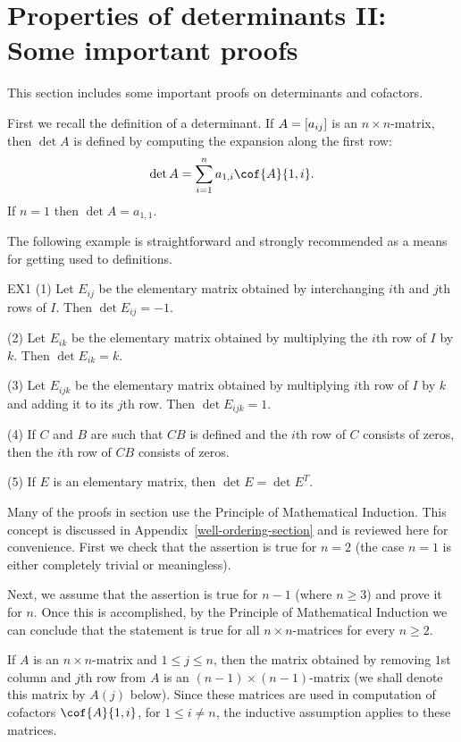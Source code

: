 \section{Properties of determinants II: Some important proofs } \label{sec:determinant-proofs}

This section includes some important proofs on determinants and cofactors.

First we recall the definition of a determinant. If $A=\left[a_{ij} \right]$ is an $n\times n$-matrix, then $\det A$ is defined by computing the expansion along the first row:
\begin{equation}
\label{E1} 
\det A=\sum_{i=1}^n a_{1,i} \cof{A}{1,i}. 
\end{equation}
If $n=1$ then $\det A=a_{1,1}$. 

The following example is straightforward and strongly recommended as a means for
getting used to definitions. 

\begin{example}{}{EX1}
(1) Let $E_{ij}$ be the elementary matrix obtained by interchanging $i$th and $j$th rows of $I$. 
Then $\det E_{ij}=-1$. 

(2) Let $E_{ik}$ be the elementary matrix obtained by multiplying the $i$th row of $I$ by $k$. 
Then $\det E_{ik}=k$. 

(3) Let $E_{ijk}$ be the elementary matrix obtained by multiplying $i$th row of $I$ by $k$ and 
adding it to its $j$th row. Then $\det E_{ijk}=1$. 

(4) If $C$ and $B$ are such that $CB$ is defined and the $i$th row of $C$ consists of zeros, 
then the $i$th row of $CB$ consists of zeros. 

(5) If $E$ is an elementary matrix, then $\det E=\det E^T$. 
\end{example} 

Many of the proofs in section use the Principle of Mathematical Induction. This concept is discussed in Appendix~\ref{well-ordering-section} and is reviewed here for convenience.
First we check that the assertion is true for $n=2$ (the case $n=1$ is either completely trivial
or meaningless). 

Next, we assume that the assertion is true for $n-1$ (where $n\geq 3$) and prove it for $n$. 
Once this is accomplished, by the Principle of Mathematical Induction we can conclude that the 
statement is true for all $n\times n$-matrices for every $n\geq 2$. 

If $A$ is an $n\times n$-matrix and $1\leq j \leq n$,
then the matrix obtained by removing $1$st column and $j$th row from $A$ 
is an $(n-1)\times (n-1)$-matrix (we shall denote this matrix by $A(j)$ below). Since these matrices 
are used in computation of cofactors $\cof{A}{1,i}$, for $1\leq i\neq n$, 
the inductive assumption applies to these matrices. 

